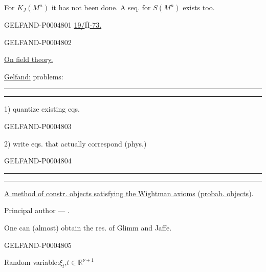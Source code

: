 For $K_J(M^n)$ it has not been done. A seq. for $S(M^n)$ exists too.


\begin{GelfandAdjacentEvidence}{GELFAND-P000480}{1}
\uline{19/\mbox{$\overline{\underline{\mathrm{II}}}$}-73.}
\qquad{}
\end{GelfandAdjacentEvidence}
\begin{GelfandAdjacentEvidence}{GELFAND-P000480}{2}


\uline{On field theory.}

\uline{Gelfand:} problems:
{\centering\rule{1.1em}{.4pt}\quad\textperiodcentered\quad\rule{1.1em}{.4pt}\par}
1) quantize existing eqs.
\end{GelfandAdjacentEvidence}
\begin{GelfandAdjacentEvidence}{GELFAND-P000480}{3}


2) write eqs. that actually correspond (phys.)
\end{GelfandAdjacentEvidence}
\begin{GelfandAdjacentEvidence}{GELFAND-P000480}{4}

{\centering\rule{1.8em}{.4pt}\quad\textperiodcentered\quad\rule{1.8em}{.4pt}\par}

\uline{A method of constr. objects satisfying the Wightman axioms} (\uline{probab. objects}).

Principal author — .

One can (almost) obtain the res. of Glimm and Jaffe.
\end{GelfandAdjacentEvidence}
\begin{GelfandAdjacentEvidence}{GELFAND-P000480}{5}


Random variable:\quad $\xi_t$,\quad $t\in\mathbb R^{\nu+1}$
\end{GelfandAdjacentEvidence}


